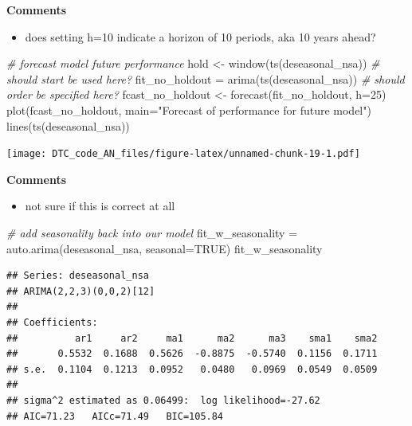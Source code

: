 \documentclass[
]{article}
\newenvironment{Shaded}{\begin{snugshade}}{\end{snugshade}}
\newcommand{\AttributeTok}[1]{\textcolor[rgb]{0.77,0.63,0.00}{#1}}
\newcommand{\CommentTok}[1]{\textcolor[rgb]{0.56,0.35,0.01}{\textit{#1}}}
\newcommand{\ConstantTok}[1]{\textcolor[rgb]{0.00,0.00,0.00}{#1}}
\newcommand{\DecValTok}[1]{\textcolor[rgb]{0.00,0.00,0.81}{#1}}
\newcommand{\FunctionTok}[1]{\textcolor[rgb]{0.00,0.00,0.00}{#1}}
\newcommand{\NormalTok}[1]{#1}
\newcommand{\OtherTok}[1]{\textcolor[rgb]{0.56,0.35,0.01}{#1}}
\newcommand{\StringTok}[1]{\textcolor[rgb]{0.31,0.60,0.02}{#1}}
\providecommand{\tightlist}{%
  \setlength{\itemsep}{0pt}\setlength{\parskip}{0pt}}
\begin{document}
\textbf{Comments}

\begin{itemize}
\tightlist
\item
  does setting h=10 indicate a horizon of 10 periods, aka 10 years
  ahead?
\end{itemize}

\begin{Shaded}
\begin{Highlighting}[]
\CommentTok{\# forecast model future performance}
\NormalTok{hold }\OtherTok{\textless{}{-}} \FunctionTok{window}\NormalTok{(}\FunctionTok{ts}\NormalTok{(deseasonal\_nsa))  }\CommentTok{\# should start be used here?}
\NormalTok{fit\_no\_holdout }\OtherTok{=} \FunctionTok{arima}\NormalTok{(}\FunctionTok{ts}\NormalTok{(deseasonal\_nsa))  }\CommentTok{\# should order be specified here?}
\NormalTok{fcast\_no\_holdout }\OtherTok{\textless{}{-}} \FunctionTok{forecast}\NormalTok{(fit\_no\_holdout, }\AttributeTok{h=}\DecValTok{25}\NormalTok{)}
\FunctionTok{plot}\NormalTok{(fcast\_no\_holdout, }\AttributeTok{main=}\StringTok{"Forecast of performance for future model"}\NormalTok{)}
\FunctionTok{lines}\NormalTok{(}\FunctionTok{ts}\NormalTok{(deseasonal\_nsa))}
\end{Highlighting}
\end{Shaded}

\texttt{[image: DTC\_code\_AN\_files/figure-latex/unnamed-chunk-19-1.pdf]}

\textbf{Comments}

\begin{itemize}
\tightlist
\item
  not sure if this is correct at all
\end{itemize}

\begin{Shaded}
\begin{Highlighting}[]
\CommentTok{\# add seasonality back into our model}
\NormalTok{fit\_w\_seasonality }\OtherTok{=} \FunctionTok{auto.arima}\NormalTok{(deseasonal\_nsa, }\AttributeTok{seasonal=}\ConstantTok{TRUE}\NormalTok{)}
\NormalTok{fit\_w\_seasonality}
\end{Highlighting}
\end{Shaded}

\begin{verbatim}
## Series: deseasonal_nsa 
## ARIMA(2,2,3)(0,0,2)[12] 
## 
## Coefficients:
##          ar1     ar2     ma1      ma2      ma3    sma1    sma2
##       0.5532  0.1688  0.5626  -0.8875  -0.5740  0.1156  0.1711
## s.e.  0.1104  0.1213  0.0952   0.0480   0.0969  0.0549  0.0509
## 
## sigma^2 estimated as 0.06499:  log likelihood=-27.62
## AIC=71.23   AICc=71.49   BIC=105.84
\end{verbatim}
\end{document}
